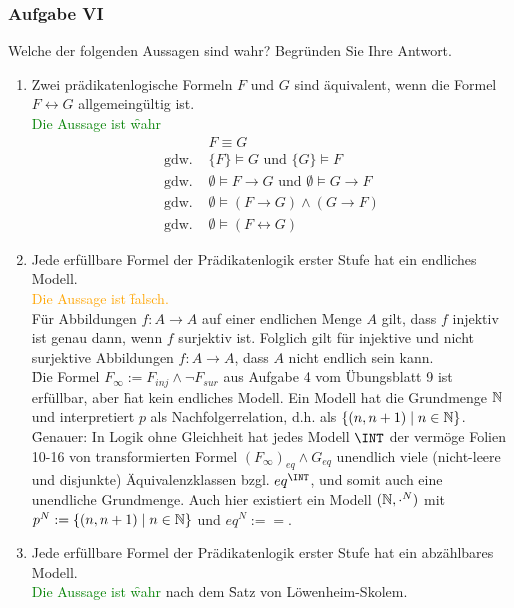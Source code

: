 \subsubsection*{Aufgabe VI}
Welche der folgenden Aussagen sind wahr? Begründen Sie Ihre Antwort.
\begin{enumerate}
\item Zwei prädikatenlogische Formeln $F$ und $G$ sind äquivalent, wenn die Formel $F \leftrightarrow G$ allgemeingültig ist. \\
\LOES \textcolor{green}{Die Aussage ist \f{wahr}} \\
\begin{align*}
& F \equiv G \\
\text{gdw. }& \{F\} \models G \text{ und } \{G\} \models F \\
\text{gdw. }& \emptyset \models F \to G \text{ und } \emptyset \models G \to F \\
\text{gdw. }& \emptyset \models (F \to G) \land (G \to F) \\
\text{gdw. }& \emptyset \models (F \leftrightarrow G)
\end{align*}
\item Jede erfüllbare Formel der Prädikatenlogik erster Stufe hat ein endliches Modell. \\
\LOES \textcolor{orange}{Die Aussage ist \f{falsch.}} \\
Für Abbildungen $f: A \to A$ auf einer endlichen Menge $A$ gilt, dass $f$ injektiv ist genau dann, wenn $f$ surjektiv ist. Folglich gilt für injektive und nicht surjektive Abbildungen $f: A \to A$, dass $A$ nicht endlich sein kann. \\
\f{Die Formel} $F_{\infty} := F_{inj} \land \lnot F_{sur}$ aus Aufgabe 4 vom Übungsblatt 9 ist erfüllbar, aber \f{hat kein endliches Modell}. Ein Modell hat die Grundmenge $\mathbb{N}$ und interpretiert $p$ als Nachfolgerrelation, d.h. als $\{(n, n+1) \mid n \in \mathbb{N} \}$. \\
\f{Genauer:} In Logik ohne Gleichheit hat jedes Modell $\INT$ der vermöge Folien 10-16 von  transformierten Formel $(F_{\infty})_{eq} \land G_{eq}$ unendlich viele (nicht-leere und disjunkte) Äquivalenzklassen bzgl. $eq^{\INT}$, und somit auch eine unendliche Grundmenge. Auch hier existiert ein Modell $(\mathbb{N}, \cdot^N)$ mit $p^N := \{(n,n+1) \mid n \in \mathbb{N}\}$ und $eq^N := =$.   
\item Jede erfüllbare Formel der Prädikatenlogik erster Stufe hat ein abzählbares Modell. \\
\LOES \textcolor{green}{Die Aussage ist \f{wahr}} nach dem \f{Satz von Löwenheim-Skolem.}

\end{enumerate}
